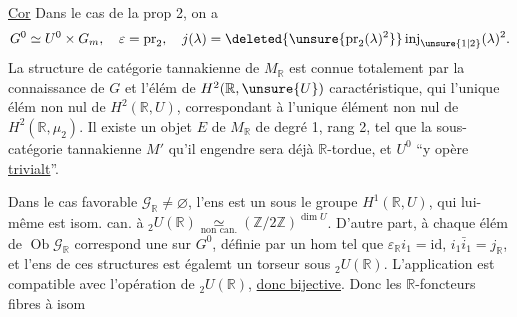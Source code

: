 \uline{Cor} Dans le cas de la prop 2,  on a
\[
G^0\simeq U^0\times G_m,\quad\varepsilon=\operatorname{pr}_2,\quad j(\lambda)=\deleted{\unsure{\operatorname{pr}_2(\lambda)^2}}\operatorname{inj}_{\unsure{1|2}}(\lambda)^2.
\]
La structure  de catégorie tannakienne de $M_{\mathbb R}$ est connue totalement par la connaissance de $G$ et l'élém de $H^2(\mathbb R,\unsure{U})$ caractéristique, qui   l'unique élém non nul de $H^2(\mathbb R,U)$, correspondant à l'unique élément non nul de $H^2(\mathbb R,\mu_2)$. Il existe un  objet $E$ de $M_{\mathbb R}$  de degré 1, rang 2,  tel que la sous-catégorie tannakienne  $M'$ qu'il engendre sera déjà $\mathbb R$-tordue, et    $U^0$ ``y opère \uline{trivialt}''.

Dans le cas favorable $\mathscr G_{\mathbb R}\ne\varnothing$,  l'ens   est un   sous le groupe $H^1(\mathbb R,U)$, qui lui-même est isom. can. à ${}_2U(\mathbb R)\underset{\text{non can.}}{\simeq}(\mathbb Z/2\mathbb Z)^{\dim U}$. D'autre part, à chaque élém de $\operatorname{Ob}\mathscr G_{\mathbb R}$ correspond une   sur $G^0$, définie par un hom
tel que $\varepsilon_{\mathbb R}i_1=\mathrm{id}$, $i_1\bar i_1=j_{\mathbb R}$, et l'ens de ces structures est égalemt un torseur sous ${}_2U(\mathbb R)$. L'application
est compatible avec l'opération de ${}_2U(\mathbb R)$, \uline{donc bijective}. Donc les $\mathbb R$-foncteurs fibres à isom
